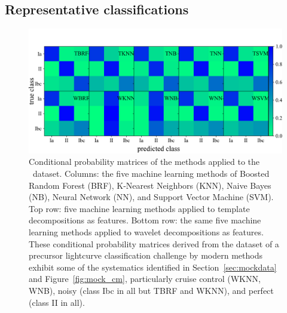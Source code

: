 \subsection{Representative classifications}
\label{sec:realdata}

\begin{figure}
	\begin{center}
    \includegraphics[width=\textwidth]{./fig/all_snphotcc_cm.png}
		\caption{Conditional probability matrices of the \citet{lochner_photometric_2016} methods applied to the \snphotcc\ dataset.
		Columns: the five machine learning methods of Boosted Random Forest (BRF), K-Nearest Neighbors (KNN), Naive Bayes (NB), Neural Network (NN), and Support Vector Machine (SVM).
    Top row: five machine learning methods applied to template decompositions as features.
    Bottom row: the same five machine learning methods applied to wavelet decompositions as features.
		These conditional probability matrices derived from the dataset of a precursor lightcurve classification challenge by modern methods exhibit some of the systematics identified in Section~\ref{sec:mockdata} and Figure~\ref{fig:mock_cm}, particularly cruise control (WKNN, WNB), noisy (class Ibc in all but TBRF and WKNN), and perfect (class II in all).
		}
		\label{fig:snphotcc_cm}
	\end{center}
\end{figure}


